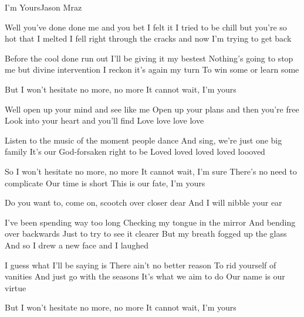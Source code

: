 \documentclass[a4paper,11pt,french]{article}
\begin{document}
\begin{Song}{I'm Yours}{Jason Mraz}
\begin{multicols}{2}

\begin{Verse}
Well you've done done me and you bet I felt it
I tried to be chill but you're so hot that I melted
I fell right through the cracks
and now I'm trying to get back
\espaceInterStrophe

Before the cool done run out 
I'll be giving it my bestest
Nothing's going to stop me but divine intervention
I reckon it's again my turn 
To win some or learn some
\end{Verse}
\espaceInterStrophe

\begin{Chorus}
But I won't hesitate no more, no more
It cannot wait, I'm yours
\end{Chorus}
\espaceInterStrophe

\begin{Verse}
Well open up your mind and see like me
Open up your plans and then you're free
Look into your heart and you'll find 
Love love love love
\espaceInterStrophe

Listen to the music of the moment people dance 
And sing, we're just one big family
It's our God-forsaken right to be 
Loved loved loved loved loooved
\end{Verse}
\espaceInterStrophe

\begin{Chorus}
So I won't hesitate no more, no more
It cannot wait, I'm sure
There's no need to complicate
Our time is short
This is our fate, I'm yours
\end{Chorus}
\espaceInterStrophe

\begin{Verse}
Do you want to, come on, scootch over closer dear
And I will nibble your ear
\espaceInterStrophe

I've been spending way too long 
Checking my tongue in the mirror
And bending over backwards 
Just to try to see it clearer
But my breath fogged up the glass
And so I drew a new face and I laughed
\espaceInterStrophe

I guess what I'll be saying is 
There ain't no better reason
To rid yourself of vanities 
And just go with the seasons
It's what we aim to do
Our name is our virtue
\end{Verse}
\espaceInterStrophe

\begin{Chorus}
But I won't hesitate no more, no more
It cannot wait, I'm yours
\end{Chorus}
\espaceInterStrophe


\end{multicols}
\end{Song}
\end{document}

